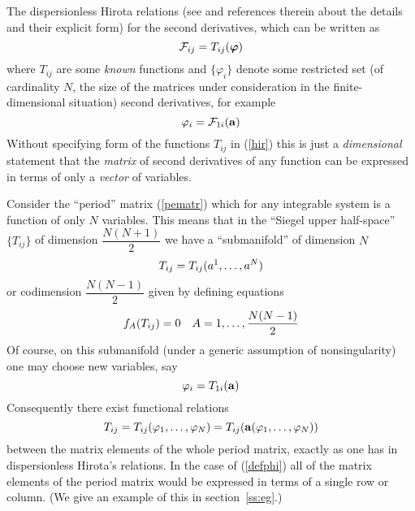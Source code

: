 \documentclass[a4paper,]{article}
\def\Bf#1{\mbox{\boldmath $#1$}}
\def\F{{\cal F}}
\begin{document}
The dispersionless Hirota relations (see \cite{BMRWZ} and references
therein about the details and their explicit form) for the second
derivatives, which can be written as
\begin{equation}
\label{hir}
\F_{ij} = T_{ij}({\Bf\varphi})
\end{equation}
where $T_{ij}$ are some {\em known} functions and $\{\varphi_i\}$ denote some
restricted set (of cardinality $N$, the size of the matrices under
consideration in the finite-dimensional situation) second
derivatives, for example
\begin{equation}
\label{vf}
\varphi_i = \F_{1i}({\bf a})
\end{equation}
Without specifying form of the functions $T_{ij}$ in (\ref{hir}) this is
just a {\em dimensional} statement that the {\em matrix} of second
derivatives of any function can be expressed in terms of only a {\em
vector} of variables.

Consider the ``period'' matrix (\ref{pematr})
which for any integrable system is a function of only $N$ variables.
This means that in the ``Siegel upper half-space'' $\{ T_{ij}\}$ of dimension
$\dfrac{N(N+1)}{2}$ we have a ``submanifold'' of dimension $N$
\begin{equation}
\label{hs1}
T_{ij} = T_{ij}(a\sp1,\dots,a\sp{N})
\end{equation}
or codimension $\dfrac{N(N-1)}{2}$ given by defining equations
\begin{equation}
\label{hs2}
f_A(T_{ij})=0
\quad
A=1,\dots,{N(N-1)\over 2}
\end{equation}
Of course, on this submanifold (under a generic assumption of
nonsingularity) one may choose new variables, say
\begin{equation}
\label{defphi}
\varphi_i = T_{1i}({\bf a})
\end{equation}
Consequently there exist functional relations
\begin{equation}
T_{ij} = T_{ij}(\varphi_1,\dots,\varphi_N) = T_{ij}({\bf a}
(\varphi_1,\dots,\varphi_N))
\end{equation}
between the matrix elements of the whole period matrix,
exactly as one has in dispersionless Hirota's relations. 
In the case of (\ref{defphi}) all of the matrix elements of
the period matrix would be expressed in terms of a single
row or column. (We give an example of this in section~\ref{ss:eg}.)
\end{document}
